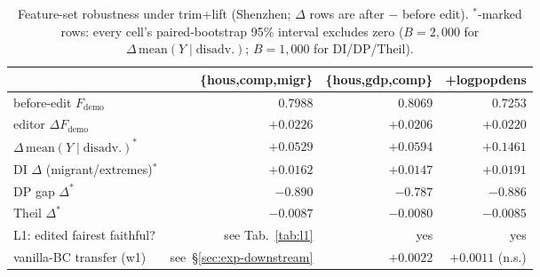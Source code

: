 \begin{table}[t]
\caption{Feature-set robustness under trim+lift (Shenzhen; $\Delta$ rows are
after $-$ before edit). $^{*}$-marked rows: every cell's paired-bootstrap
95\% interval excludes zero ($B = 2{,}000$ for
$\Delta\,\mathrm{mean}(Y \mid \mathrm{disadv.})$; $B = 1{,}000$ for
DI/DP/Theil).}
\label{tab:featsets}
\footnotesize
\setlength{\tabcolsep}{3pt}
\begin{tabular}{lrrr}
\toprule
 & \{hous,comp,migr\} & \{hous,gdp,comp\} & +logpopdens \\
\midrule
before-edit $F_{\mathrm{demo}}$ & 0.7988 & 0.8069 & 0.7253 \\
editor $\Delta F_{\mathrm{demo}}$ & $+0.0226$ & $+0.0206$ & $+0.0220$ \\
$\Delta\,\mathrm{mean}(Y \mid \mathrm{disadv.})^{*}$ & $+0.0529$ & $+0.0594$ & $+0.1461$ \\ %
DI $\Delta$ (migrant/extremes)$^{*}$ & $+0.0162$ & $+0.0147$ & $+0.0191$ \\ %
DP gap $\Delta^{*}$ & $-0.890$ & $-0.787$ & $-0.886$ \\ %
Theil $\Delta^{*}$ & $-0.0087$ & $-0.0080$ & $-0.0085$ \\ %
L1: edited fairest faithful? & see Tab.~\ref{tab:l1} & yes & yes \\ %
vanilla-BC transfer (w1) & see~\S\ref{sec:exp-downstream} & $+0.0022$ & $+0.0011$ (n.s.) \\ %

\end{tabular}
\end{table}
